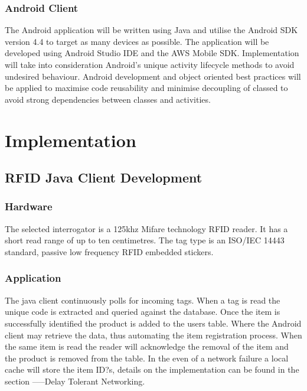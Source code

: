 \documentclass[a4paper, 11pt]{article}
\begin{document}
\subsubsection {Android Client}
The Android application will be written using Java and utilise the Android SDK version 4.4 to target as many devices as possible. The application will be developed using Android Studio IDE and the AWS Mobile SDK. Implementation will take into consideration Android's unique activity lifecycle methods to avoid undesired behaviour. Android development and object oriented best practices will be applied to maximise code reusability and minimise decoupling of classed to avoid strong dependencies between classes and activities.

\clearpage


\section{Implementation}

\subsection{RFID Java Client Development}
\subsubsection{Hardware}The selected interrogator is a 125khz Mifare technology RFID reader. It has a short read range of up to ten centimetres. The tag type is an ISO/IEC 14443 standard, passive low frequency RFID embedded stickers.

\subsubsection{Application} 
The java client continuously polls for incoming tags. When a tag is read the unique code is extracted and queried against the database. Once the item is successfully identified the product is added to the users table. Where the Android client may retrieve the data, thus automating the item registration process. When the same item is read the reader will acknowledge the removal of the item and the product is removed from the table.
In the even of a network failure a local cache will store the item ID?s, details on the implementation can be found in the section -----Delay Tolerant Networking. 
\end{document}
